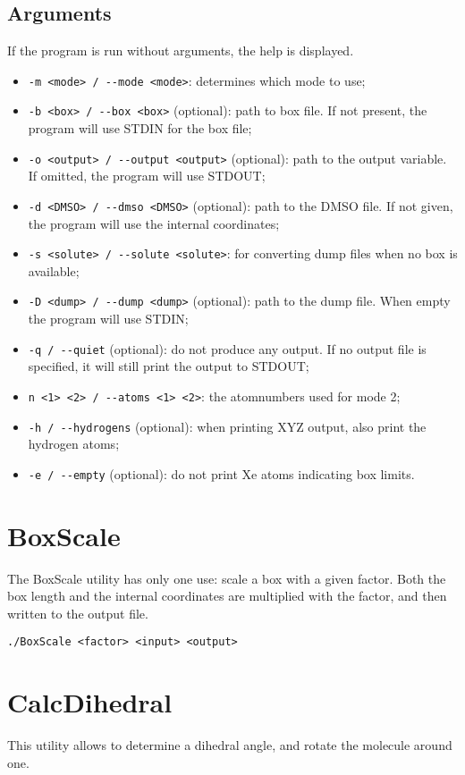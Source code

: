 \section{Arguments}
If the program is run without arguments, the help is displayed.

\begin{itemize}
	\item \verb|-m <mode> / --mode <mode>|: determines which mode to use;
	\item \verb|-b <box> / --box <box>| (optional): path to box file. If not 
	present, the program will use STDIN for the box file;
	\item \verb|-o <output> / --output <output>| (optional): path to the output 
	variable. If omitted, the program will use STDOUT;
	\item \verb|-d <DMSO> / --dmso <DMSO>| (optional): path to the DMSO file. 
	If not given, the program will use the internal coordinates;
	\item \verb|-s <solute> / --solute <solute>|: for converting dump files 
	when no box is available;
	\item \verb|-D <dump> / --dump <dump>| (optional): path to the dump file. 
	When empty the program will use STDIN;
	\item \verb|-q / --quiet| (optional): do not produce any output. If no 
	output file is 
	specified, it will still print the output to STDOUT;
	\item \verb|n <1> <2> / --atoms <1> <2>|: the atomnumbers used for mode 2;
	\item \verb|-h / --hydrogens| (optional): when printing XYZ output, also 
	print the hydrogen atoms;
	\item \verb|-e / --empty| (optional): do not print Xe atoms indicating box 
	limits.
\end{itemize}

\chapter{BoxScale}
The BoxScale utility has only one use: scale a box with a given factor. Both 
the box length and the internal coordinates are multiplied with the factor, and 
then written to the output file.

\begin{lstlisting}[caption=BoxScale]
	./BoxScale <factor> <input> <output>
\end{lstlisting}

\chapter{CalcDihedral}
This utility allows to determine a dihedral angle, and rotate the molecule 
around one.

